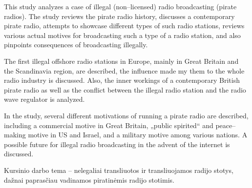 \documentclass[kursinis-darbas]{vukf}
\begin{document}
\begin{vukfAbstractEn}

This study analyzes a case of illegal (non--licensed) radio broadcasting (pirate radios). The study reviews the pirate radio history, discusses a contemporary pirate radio, attempts to showcase different types of such radio stations, reviews various actual motives for broadcasting such a type of a radio station, and also pinpoints consequences of broadcasting illegally.

The first illegal offshore radio stations in Europe, mainly in Great Britain and the Scandinavia region, are described, the influence made my them to the whole radio industry is discussed. Also, the inner workings of a contemporary British pirate radio as well as the conflict between the illegal radio station and the radio wave regulator is analyzed.

In the study, several different motivations of running a pirate radio are described, including a commercial motive in Great Britain, „public spirited“ and peace--making motive in US and Israel, and a military motive among various nations. A possible future for illegal radio broadcasting in the advent of the internet is discussed.

\end{vukfAbstractEn}


%
%





%
%

\vukfIntroduction


Kursinio darbo tema – nelegaliai transliuotos ir transliuojamos radijo stotys, dažnai paprasčiau vadinamos piratinėmis radijo stotimis.
\end{document}
